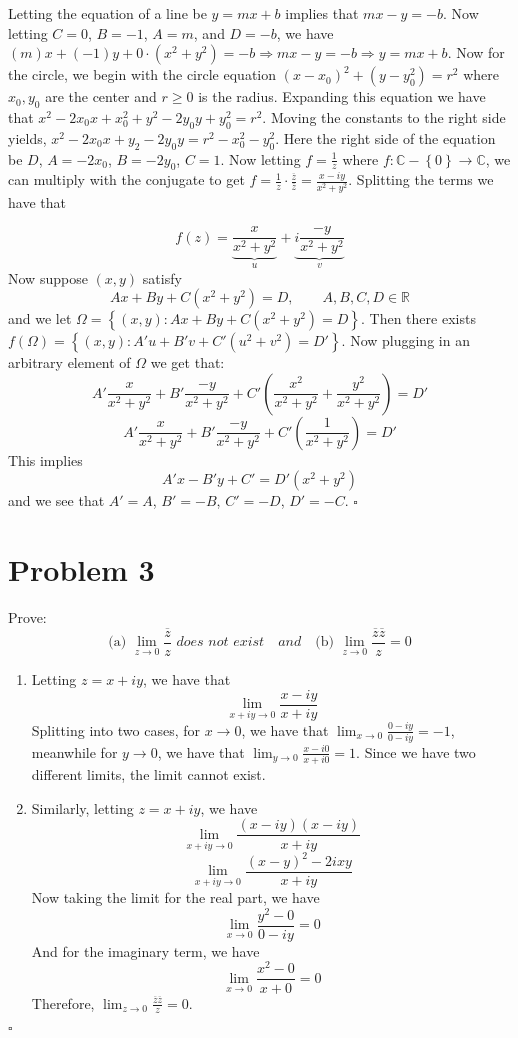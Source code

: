 \documentclass[12pt]{article}
\newcommand{\C}{\mathbb{C}}
\newcommand{\R}{\mathbb{R}}
\newcommand{\set}[1]{\left\{ #1\right\}}
\newenvironment{proof}{\noindent{\bf Proof.}}{\hfill $\square$\medskip}
\begin{document}
\begin{proof}
Letting the equation of a line be $y=mx+b$ implies that $mx-y=-b$. Now letting $C=0$, $B=-1$, $A=m$, and $D=-b$, we have $(m)x+(-1)y+0\cdot(x^{2}+y^{2})=-b\Rightarrow mx-y=-b\Rightarrow y=mx+b$. Now for the circle, we begin with the circle equation $(x-x_{0})^{2}+(y-y_{0}^{2})=r^{2}$ where $x_{0},y_{0}$ are the center and $r\geq 0$ is the radius. Expanding this equation we have that $x^{2}-2x_{0}x+x_{0}^{2}+y^{2}-2y_{0}y+y_{0}^{2}=r^{2}$. Moving the constants to the right side yields, $x^{2}-2x_{0}x+y_{2}-2y_{0}y=r^{2}-x_{0}^{2}-y_{0}^{2}$. Here the right side of the equation be $D$, $A=-2x_{0}$, $B=-2y_{0}$, $C=1$. Now letting $f=\frac{1}{z}$ where $f:\C-\set{0}\rightarrow\C$, we can multiply with the conjugate to get $f=\frac{1}{z}\cdot\frac{\overline{z}}{\overline{z}}=\frac{x-iy}{x^{2}+y^{2}}$. Splitting the terms we have that

$$f(z)=\underbrace{\frac{x}{x^{2}+y^{2}}}_{u}+\underbrace{i\frac{-y}{x^{2}+y^{2}}}_{v}$$
Now suppose $(x,y)$ satisfy $$Ax+By+C(x^{2}+y^{2})=D,\qquad A,B,C,D\in\R$$
and we let $\Omega=\set{(x,y): Ax+By+C(x^{2}+y^{2})=D}$. Then there exists $f(\Omega)=\set{(x,y): A'u+B'v+C'(u^{2}+v^{2})=D'}$. Now plugging in an arbitrary element of $\Omega$ we get that:
$$A'\frac{x}{x^{2}+y^{2}}+B'\frac{-y}{x^{2}+y^{2}}+C'(\frac{x^{2}}{x^{2}+y^{2}}+\frac{y^{2}}{x^{2}+y^{2}})=D'$$
$$A'\frac{x}{x^{2}+y^{2}}+B'\frac{-y}{x^{2}+y^{2}}+C'(\frac{1}{x^{2}+y^{2}})=D'$$
This implies
$$A'x-B'y+C'=D'(x^{2}+y^{2})$$ and we see that $A'=A$, $B'=-B$, $C'=-D$, $D'=-C$.
\end{proof}


\section{Problem 3}
Prove:
$$\text{(a) }\lim_{z\to0}\frac{\overline{z}}{z} \textit{ does not exist}\quad and \quad \text{(b) }\lim_{z\to0}\frac{\overline{z}\overline{z}}{z}=0$$

\begin{proof}
\begin{enumerate}[label=\textbf{(\alph*)}]
    \item Letting $z=x+iy$, we have that $$\lim_{x+iy\to0}\frac{x-iy}{x+iy}$$
    Splitting into two cases, for $x\to0$, we have that $\lim_{x\to 0}\frac{0-iy}{0-iy}=-1$, meanwhile for $y\to0$, we have that $\lim_{y\to0}\frac{x-i0}{x+i0}=1$. Since we have two different limits, the limit cannot exist.
    \item Similarly, letting $z=x+iy$, we have
    $$\lim_{x+iy\to0}{\frac{(x-iy)(x-iy)}{x+iy}}$$
    $$\lim_{x+iy\to0}{\frac{(x-y)^{2}-2ixy}{x+iy}}$$
    Now taking the limit for the real part, we have
    $$\lim_{x\to0}{\frac{y^{2}-0}{0-iy}}=0$$
    And for the imaginary term, we have
    $$\lim_{x\to0}{\frac{x^{2}-0}{x+0}}=0$$
    Therefore, $\lim_{z\to0}\frac{\overline{z}\overline{z}}{z}=0$.
\end{enumerate}
\end{proof}
\end{document}
